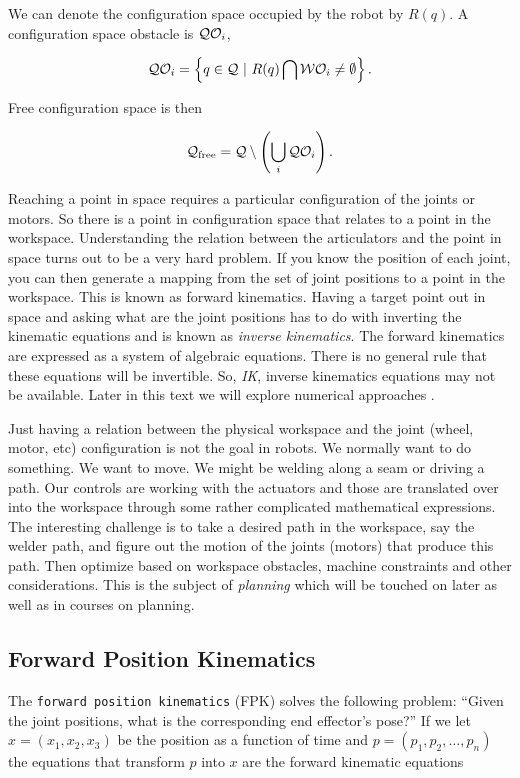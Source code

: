 We can denote the configuration space occupied by the robot by \(R(q)\).
A configuration space obstacle is \({\cal Q}{\cal O}_i\),

\[{\cal Q}{\cal O}_i = \left\{ q\in {\cal Q} ~|~ R(q) \bigcap {\cal W}{\cal O}_i \neq \emptyset\right\}.\]

Free configuration space is then

\[{\cal Q}_\text{free} = {\cal Q}\setminus \left( \bigcup_i {\cal Q}{\cal O}_i\right).\]

Reaching a point in space requires a particular configuration of the
joints or motors. So there is a point in configuration space that
relates to a point in the workspace. Understanding the relation between
the articulators and the point in space turns out to be a very hard
problem. If you know the position of each joint, you can then generate a
mapping from the set of joint positions to a point in the workspace.
This is known as forward kinematics. Having a target point out in space
and asking what are the joint positions has to do with inverting the
kinematic equations and is known as \emph{inverse kinematics}. The
forward kinematics are expressed as a system of algebraic equations.
There is no general rule that these equations will be invertible. So,
\emph{IK}, inverse kinematics equations may not be available. Later in
this text we will explore numerical approaches .

Just having a relation between the physical workspace and the joint
(wheel, motor, etc) configuration is not the goal in robots. We normally
want to do something. We want to move. We might be welding along a seam
or driving a path. Our controls are working with the actuators and those
are translated over into the workspace through some rather complicated
mathematical expressions. The interesting challenge is to take a desired
path in the workspace, say the welder path, and figure out the motion of
the joints (motors) that produce this path. Then optimize based on
workspace obstacles, machine constraints and other considerations. This
is the subject of \emph{planning} which will be touched on later as well
as in courses on planning.

\hypertarget{forward-position-kinematics}{%
\subsection{Forward Position
Kinematics}\label{forward-position-kinematics}}

The \texttt{forward\ position\ kinematics} (FPK) solves the following
problem: ``Given the joint positions, what is the corresponding end
effector's pose?'' If we let \(x = (x_1, x_2, x_3)\) be the position as
a function of time and \(p = (p_1, p_2, \dots , p_n)\) the equations
that transform \(p\) into \(x\) are the forward kinematic equations

